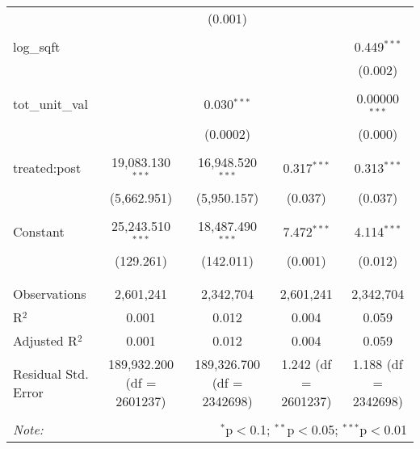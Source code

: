 \begin{table}[H]
{\begin{tabular}{@{\extracolsep{5pt}}lcccc}
   &  & (0.001) &  &  \\  

   & & & & \\  

  log\_sqft &  &  &  & 0.449$^{***}$ \\  

   &  &  &  & (0.002) \\  

   & & & & \\  

  tot\_unit\_val &  & 0.030$^{***}$ &  & 0.00000$^{***}$ \\  

   &  & (0.0002) &  & (0.000) \\  

   & & & & \\  

  treated:post & 19,083.130$^{***}$ & 16,948.520$^{***}$ & 0.317$^{***}$ & 0.313$^{***}$ \\  

   & (5,662.951) & (5,950.157) & (0.037) & (0.037) \\  

   & & & & \\  

  Constant & 25,243.510$^{***}$ & 18,487.490$^{***}$ & 7.472$^{***}$ & 4.114$^{***}$ \\  

   & (129.261) & (142.011) & (0.001) & (0.012) \\  

   & & & & \\  

 \hline \\[-1.8ex]  

 Observations & 2,601,241 & 2,342,704 & 2,601,241 & 2,342,704 \\  

 R$^{2}$ & 0.001 & 0.012 & 0.004 & 0.059 \\  

 Adjusted R$^{2}$ & 0.001 & 0.012 & 0.004 & 0.059 \\  

 Residual Std. Error & 189,932.200 (df = 2601237) & 189,326.700 (df = 2342698) & 1.242 (df = 2601237) & 1.188 (df = 2342698) \\  

 \hline  

 \hline \\[-1.8ex]  

 \textit{Note:}  & \multicolumn{4}{r}{$^{*}$p$<$0.1; $^{**}$p$<$0.05; $^{***}$p$<$0.01} \\  

 \end{tabular}}  

 \end{table}  

